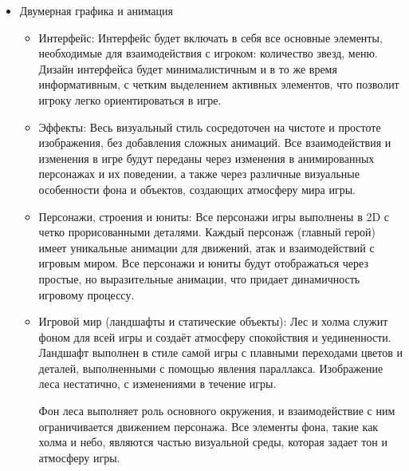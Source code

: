 \documentclass{article}
\begin{document}
\begin{itemize}
    \item Двумерная графика и анимация
    \begin{itemize}
        \item Интерфейс:
        Интерфейс будет включать в себя все основные элементы, необходимые для взаимодействия с игроком: количество звезд, меню. Дизайн интерфейса будет минималистичным и в то же время информативным, с четким выделением активных элементов, что позволит игроку легко ориентироваться в игре.
        \item Эффекты:
        Весь визуальный стиль сосредоточен на чистоте и простоте изображения, без добавления сложных анимаций. Все взаимодействия и изменения в игре будут переданы через изменения в анимированных персонажах и их поведении, а также через различные визуальные особенности фона и объектов, создающих атмосферу мира игры.
        \item Персонажи, строения и юниты:
        Все персонажи игры выполнены в 2D с четко прорисованными деталями. Каждый персонаж (главный герой) имеет уникальные анимации для движений, атак и взаимодействий с игровым миром. Все персонажи и юниты будут отображаться через простые, но выразительные анимации, что придает динамичность игровому процессу.
        \item Игровой мир (ландшафты и статические объекты):
        Лес и холма служит фоном для всей игры и создаёт атмосферу спокойствия и уединенности. Ландшафт выполнен в стиле самой игры с плавными переходами цветов и деталей, выполненными с помощью явления параллакса. Изображение леса нестатично, с изменениями в течение игры.
        
        Фон леса выполняет роль основного окружения, и взаимодействие с ним ограничивается движением персонажа. Все элементы фона, такие как холма и небо, являются частью визуальной среды, которая задает тон и атмосферу игры.
    \end{itemize}
\end{itemize}
\end{document}
